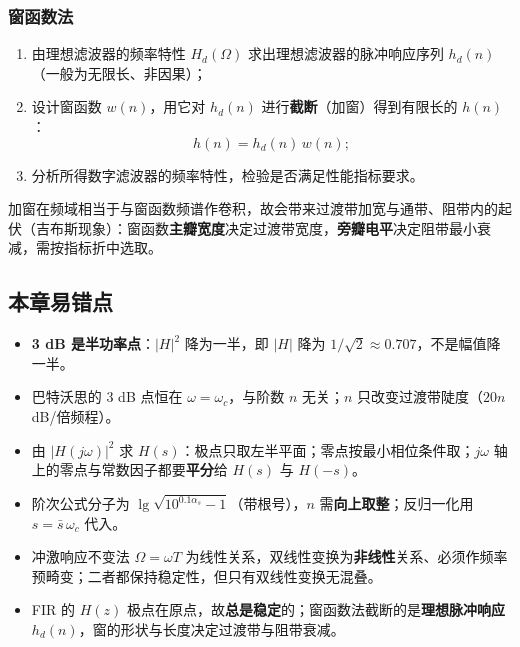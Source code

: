 \subsubsection{窗函数法}
\begin{enumerate}
\item 由理想滤波器的频率特性 $H_d(\Omega)$ 求出理想滤波器的脉冲响应序列 $h_d(n)$（一般为无限长、非因果）；
\item 设计窗函数 $w(n)$，用它对 $h_d(n)$ 进行\textbf{截断}（加窗）得到有限长的 $h(n)$：
\begin{equation}
h(n)=h_d(n)\,w(n);
\end{equation}
\item 分析所得数字滤波器的频率特性，检验是否满足性能指标要求。
\end{enumerate}
加窗在频域相当于与窗函数频谱作卷积，故会带来过渡带加宽与通带、阻带内的起伏（吉布斯现象）：窗函数\textbf{主瓣宽度}决定过渡带宽度，\textbf{旁瓣电平}决定阻带最小衰减，需按指标折中选取。

\subsection{本章易错点}
\begin{itemize}
\item \textbf{3 dB 是半功率点}：$|H|^2$ 降为一半，即 $|H|$ 降为 $1/\sqrt{2}\approx0.707$，不是幅值降一半。
\item 巴特沃思的 3 dB 点恒在 $\omega=\omega_c$，与阶数 $n$ 无关；$n$ 只改变过渡带陡度（$20n$ dB/倍频程）。
\item 由 $|H(j\omega)|^2$ 求 $H(s)$：极点只取左半平面；零点按最小相位条件取；$j\omega$ 轴上的零点与常数因子都要\textbf{平分}给 $H(s)$ 与 $H(-s)$。
\item 阶次公式分子为 $\lg\sqrt{10^{0.1\alpha_s}-1}$（带根号），$n$ 需\textbf{向上取整}；反归一化用 $s=\bar{s}\,\omega_c$ 代入。
\item 冲激响应不变法 $\Omega=\omega T$ 为线性关系，双线性变换为\textbf{非线性}关系、必须作频率预畸变；二者都保持稳定性，但只有双线性变换无混叠。
\item FIR 的 $H(z)$ 极点在原点，故\textbf{总是稳定}的；窗函数法截断的是\textbf{理想脉冲响应} $h_d(n)$，窗的形状与长度决定过渡带与阻带衰减。
\end{itemize}
